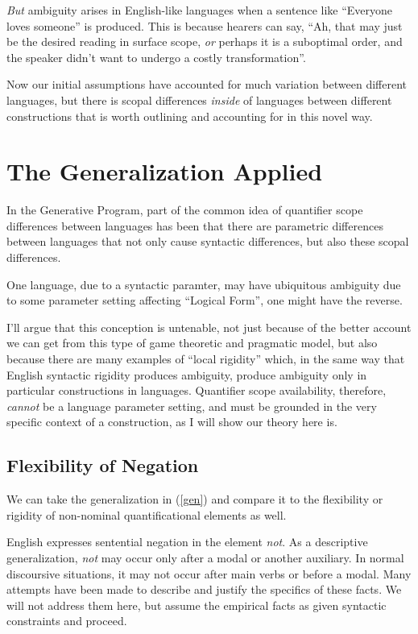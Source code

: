\documentclass{article}
\begin{document}
\emph{But} ambiguity arises in English-like languages when a sentence like ``Everyone loves someone'' is produced.
This is because hearers can say, ``Ah, that may just be the desired reading in surface scope, \emph{or} perhaps it is a suboptimal order, and the speaker didn't want to undergo a costly transformation''.

Now our initial assumptions have accounted for much variation between different languages, but there is scopal differences \emph{inside} of languages between different constructions that is worth outlining and accounting for in this novel way.

\section{The Generalization Applied}

In the Generative Program, part of the common idea of quantifier scope differences between languages has been that there are parametric differences between languages that not only cause syntactic differences, but also these scopal differences.

One language, due to a syntactic paramter, may have ubiquitous ambiguity due to some parameter setting affecting ``Logical Form'', one might have the reverse.

I'll argue that this conception is untenable, not just because of the better account we can get from this type of game theoretic and pragmatic model, but also because there are many examples of ``local rigidity'' which, in the same way that English syntactic rigidity produces ambiguity, produce ambiguity only in particular constructions in languages.
Quantifier scope availability, therefore, \emph{cannot} be a language parameter setting, and must be grounded in the very specific context of a construction, as I will show our theory here is.

\subsection{Flexibility of Negation}

We can take the generalization in (\ref{gen}) and compare it to the flexibility or rigidity of non-nominal quantificational elements as well.

English expresses sentential negation in the element \emph{not}. As a descriptive generalization, \emph{not} may occur only after a modal or another auxiliary. In normal discoursive situations, it may not occur after main verbs or before a modal. Many attempts have been made to describe and justify the specifics of these facts. We will not address them here, but assume the empirical facts as given syntactic constraints and proceed.
\end{document}
